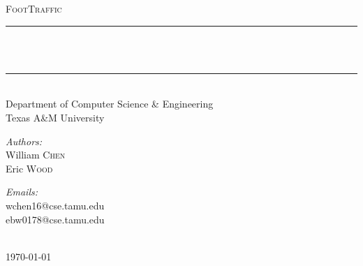 \newcommand{\HRule}{\rule{\linewidth}{0.5mm}}
%
%
\begin{titlepage}
  \begin{center}
  \textsc{\Large FootTraffic}\\[0.5cm]
  \HRule \\[0.4cm]
  {\huge \bfseries \PaperTitle}\\[0.2cm]
  \HRule \\[1cm]
  
  \large{Department of Computer Science \& Engineering} \\
  \large{Texas A\&M University} \\[1cm]

  \begin{minipage}{0.4\textwidth}
    \begin{flushleft} \large
    \emph{Authors:}\\
    William \textsc{Chen} \\
    Eric \textsc{Wood}
    \end{flushleft}
  \end{minipage}
  \begin{minipage}{0.4\textwidth}
    \begin{flushright} \large
    \emph{Emails:} \\
    wchen16@cse.tamu.edu\\
    ebw0178@cse.tamu.edu
    \end{flushright}
  \end{minipage}
  \\[1cm]
  \large{\today}
  \vfill
  
  \end{center}
\end{titlepage}
